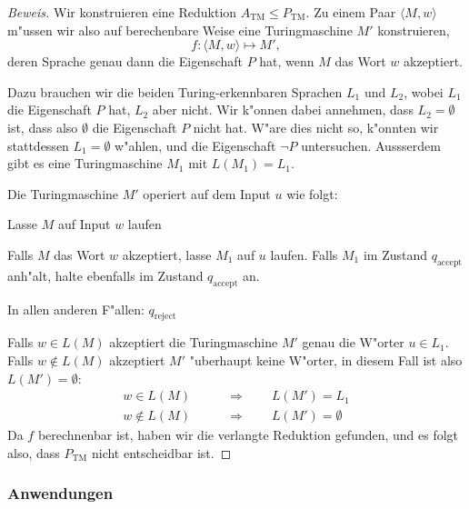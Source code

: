 \begin{proof}[Beweis]
Wir konstruieren eine Reduktion $A_\text{TM}\le P_{\text{TM}}$.
Zu einem Paar
$\langle M,w\rangle$
m"ussen wir also auf
berechenbare Weise eine Turingmaschine
$M'$ konstruieren,
\[
f\colon \langle M,w\rangle\mapsto M',
\]
deren Sprache genau dann die Eigenschaft $P$
hat, wenn $M$ das Wort $w$ akzeptiert.

Dazu brauchen wir die beiden Turing-erkennbaren Sprachen $L_1$ und $L_2$,
wobei $L_1$ die Eigenschaft $P$ hat, $L_2$ aber nicht.
Wir k"onnen dabei annehmen, dass $L_2=\emptyset$ ist, dass also
$\emptyset$ die Eigenschaft $P$ nicht hat. W"are dies nicht so, k"onnten
wir stattdessen $L_1=\emptyset$  w"ahlen, und die Eigenschaft $\neg P$
untersuchen. Aussserdem gibt es eine Turingmaschine $M_1$ mit $L(M_1)=L_1$.

Die Turingmaschine $M'$ operiert auf dem Input $u$ wie folgt:
\medskip
\begin{compactenum}
\item Lasse $M$ auf Input $w$ laufen
\item Falls $M$ das Wort $w$ akzeptiert, lasse $M_1$ auf $u$ laufen.
Falls $M_1$ im Zustand $q_{\text{accept}}$ anh"alt, halte ebenfalls
im Zustand $q_{\text{accept}}$ an.
\item In allen anderen F"allen: $q_{\text{reject}}$
\end{compactenum}
\medskip

Falls $w\in L(M)$ akzeptiert die Turingmaschine $M'$ genau die W"orter
$u\in L_1$. Falls $w\not\in L(M)$ akzeptiert $M'$ "uberhaupt keine
W"orter, in diesem Fall ist also $L(M')=\emptyset$:
\begin{align*}
w\in L(M)&\qquad \Rightarrow\qquad L(M')=L_1\\
w\not\in L(M)&\qquad \Rightarrow\qquad L(M')=\emptyset
\end{align*}
Da $f$ berechnenbar ist, haben wir die verlangte Reduktion
gefunden, und es folgt also, dass $P_{\text{TM}}$ nicht
entscheidbar ist.
\end{proof}

\subsubsection{Anwendungen}

